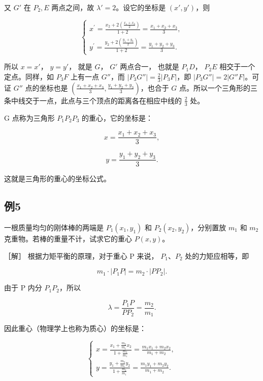 又 \(G'\) 在 \(P_{2}, E\) 两点之间，故 \(\lambda' = 2\)。设它的坐标是
\((x', y')\)，则

\[
\left\{ \begin{array}{l} x^{\prime} = \frac {x_{2} + 2 \left(\frac {x_{1} + x_{3}}{2}\right)}{1 + 2} = \frac {x_{1} + x_{2} + x_{3}}{3}, \\ y^{\prime} = \frac {y_{2} + 2 \left(\frac {y_{1} + y_{3}}{2}\right)}{1 + 2} = \frac {y_{1} + y_{2} + y_{3}}{3}. \end{array} \right.
\]

所以 \(x = x'\)， \(y = y'\)， 就是 \(G\)， \(G'\) 两点合一， 也就是
\(P_1D\)， \(P_2E\) 相交于一个定点。同样，如 \(P_{3}F\) 上有一点
\(G''\)，而 \(|P_{3}G''| = \frac{2}{3} |P_{3}F|\)，即
\(|P_{3}G''| = 2|G''F|\)。可证 \(G''\) 点的坐标也是
\(\left(\frac{x_1 + x_2 + x_3}{3}, \frac{y_1 + y_2 + y_3}{3}\right)\)，也合于
\(G\)
点。所以一个三角形的三条中线交于一点，此点与三个顶点的距离各在相应中线的
\(\frac{2}{3}\) 处。

G 点称为三角形 \(P_{1}P_{2}P_{3}\) 的重心，它的坐标是：

\[
x = \frac {x_{1} + x_{2} + x_{3}}{3},
\]

\[
y = \frac {y_{1} + y_{2} + y_{3}}{3}.
\]

这就是三角形的重心的坐标公式。

\subsection{例5}\label{ux4f8b5}

一根质量均匀的刚体棒的两端是 \(P_{1}(x_{1},y_{1})\) 和
\(P_{2}(x_{2},y_{2})\)，分别置放 \(m_{1}\) 和 \(m_{2}\)
克重物。若棒的重量不计，试求它的重心 \(P(x,y)\)。

［解］ 根据力矩平衡的原理，对于重心 P 来说， \(P_{1}\)、\(P_{2}\)
处的力矩应相等，即

\[
m_{1} \cdot | P_{1} P | = m_{2} \cdot | PP_{2} |.
\]

由于 P 内分 \(P_{1}P_{2}\)，所以

\[
\lambda = \frac {P_{1} P}{PP_{2}} = \frac {m_{2}}{m_{1}}.
\]

因此重心（物理学上也称为质心）的坐标是：

\[
\left\{ \begin{array}{l} x = \frac {x_{1} + \frac {m_{2}}{m_{1}} x_{2}}{1 + \frac {m_{2}}{m_{1}}} = \frac {m_{1} x_{1} + m_{2} x_{2}}{m_{1} + m_{2}}, \\ y = \frac {y_{1} + \frac {m_{2}}{m_{1}} y_{2}}{1 + \frac {m_{2}}{m_{1}}} = \frac {m_{1} y_{1} + m_{2} y_{2}}{m_{1} + m_{2}}. \end{array} \right.
\]

